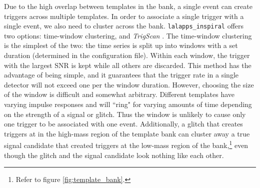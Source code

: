 Due to the high overlap between templates in the bank, a single event can
create triggers across multiple templates. In order to associate a single
trigger with a single event, we also need to cluster across the bank.
\texttt{lalapps\_inspiral} offers two options: time-window clustering, and
\emph{TrigScan} \cite{SenguptaTrigScan:2008}. The time-window clustering is the
simplest of the two: the time series is split up into windows with a set
duration (determined in the configuration file). Within each window, the
trigger with the largest \ac{SNR} is kept while all others are discarded. This
method has the advantage of being simple, and it guarantees that the trigger
rate in a single detector will not exceed one per the window duration. However,
choosing the size of the window is difficult and somewhat arbitrary. Different
templates have varying impulse responses and will ``ring" for varying amounts
of time depending on the strength of a signal or glitch. Thus the window is
unlikely to cause only one trigger to be associated with one event.
Additionally, a glitch that creates triggers at in the high-mass region of the
template bank can cluster away a true signal candidate that created triggers at
the low-mass region of the bank,\footnote{Refer to figure
\ref{fig:template_bank}.} even though the glitch and the signal candidate look
nothing like each other.

